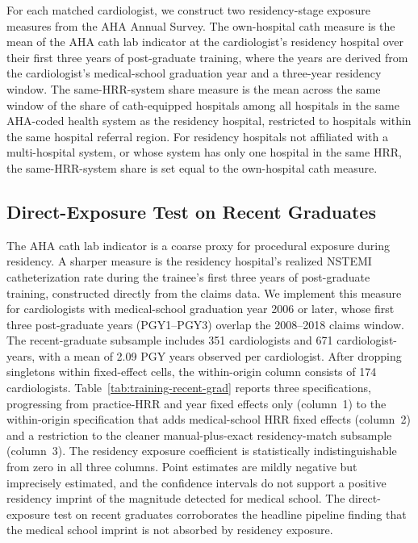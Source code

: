 \documentclass[12pt]{article}
\begin{document}
For each matched cardiologist, we construct two residency-stage exposure measures from the AHA Annual Survey. The own-hospital cath measure is the mean of the AHA cath lab indicator at the cardiologist's residency hospital over their first three years of post-graduate training, where the years are derived from the cardiologist's medical-school graduation year and a three-year residency window. The same-HRR-system share measure is the mean across the same window of the share of cath-equipped hospitals among all hospitals in the same AHA-coded health system as the residency hospital, restricted to hospitals within the same hospital referral region. For residency hospitals not affiliated with a multi-hospital system, or whose system has only one hospital in the same HRR, the same-HRR-system share is set equal to the own-hospital cath measure.

\subsection{Direct-Exposure Test on Recent Graduates}\label{sec:app-recent-grad}

The AHA cath lab indicator is a coarse proxy for procedural exposure during residency. A sharper measure is the residency hospital's realized NSTEMI catheterization rate during the trainee's first three years of post-graduate training, constructed directly from the claims data. We implement this measure for cardiologists with medical-school graduation year 2006 or later, whose first three post-graduate years (PGY1--PGY3) overlap the 2008--2018 claims window. The recent-graduate subsample includes 351 cardiologists and 671 cardiologist-years, with a mean of 2.09 PGY years observed per cardiologist. After dropping singletons within fixed-effect cells, the within-origin column consists of 174 cardiologists. Table~\ref{tab:training-recent-grad} reports three specifications, progressing from practice-HRR and year fixed effects only (column~1) to the within-origin specification that adds medical-school HRR fixed effects (column~2) and a restriction to the cleaner manual-plus-exact residency-match subsample (column~3). The residency exposure coefficient is statistically indistinguishable from zero in all three columns. Point estimates are mildly negative but imprecisely estimated, and the confidence intervals do not support a positive residency imprint of the magnitude detected for medical school. The direct-exposure test on recent graduates corroborates the headline pipeline finding that the medical school imprint is not absorbed by residency exposure.
\end{document}
